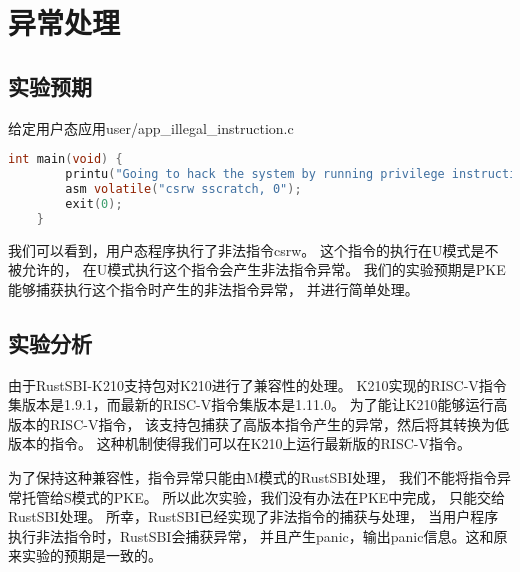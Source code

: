 \section{异常处理}

\subsection{实验预期}

给定用户态应用user/app\_illegal\_instruction.c

\begin{lstlisting}[caption={用户态应用app\_illegal\_instruction.c}, label={lst:app_illegal_instruction}, language=C]
    int main(void) {
        printu("Going to hack the system by running privilege instructions.\n");
        asm volatile("csrw sscratch, 0");
        exit(0);
    }
\end{lstlisting}

我们可以看到，用户态程序执行了非法指令csrw。
这个指令的执行在U模式是不被允许的，
在U模式执行这个指令会产生非法指令异常。
我们的实验预期是PKE能够捕获执行这个指令时产生的非法指令异常，
并进行简单处理。


\subsection{实验分析}

由于RustSBI-K210支持包对K210进行了兼容性的处理。
K210实现的RISC-V指令集版本是1.9.1，而最新的RISC-V指令集版本是1.11.0。
为了能让K210能够运行高版本的RISC-V指令，
该支持包捕获了高版本指令产生的异常，然后将其转换为低版本的指令。
这种机制使得我们可以在K210上运行最新版的RISC-V指令。

为了保持这种兼容性，指令异常只能由M模式的RustSBI处理，
我们不能将指令异常托管给S模式的PKE。
所以此次实验，我们没有办法在PKE中完成，
只能交给RustSBI处理。
所幸，RustSBI已经实现了非法指令的捕获与处理，
当用户程序执行非法指令时，RustSBI会捕获异常，
并且产生panic，输出panic信息。这和原来实验的预期是一致的。

